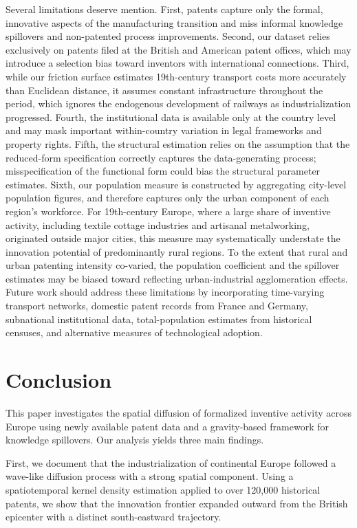 \documentclass[letterpaper,12pt,leqno]{article}
\begin{document}
Several limitations deserve mention. First, patents capture only the formal, innovative aspects of the manufacturing transition and miss informal knowledge spillovers and non-patented process improvements. Second, our dataset relies exclusively on patents filed at the British and American patent offices, which may introduce a selection bias toward inventors with international connections. Third, while our friction surface estimates 19th-century transport costs more accurately than Euclidean distance, it assumes constant infrastructure throughout the period, which ignores the endogenous development of railways as industrialization progressed. Fourth, the institutional data is available only at the country level and may mask important within-country variation in legal frameworks and property rights. Fifth, the structural estimation relies on the assumption that the reduced-form specification correctly captures the data-generating process; misspecification of the functional form could bias the structural parameter estimates. Sixth, our population measure is constructed by aggregating city-level population figures, and therefore captures only the urban component of each region's workforce. For 19th-century Europe, where a large share of inventive activity, including textile cottage industries and artisanal metalworking, originated outside major cities, this measure may systematically understate the innovation potential of predominantly rural regions. To the extent that rural and urban patenting intensity co-varied, the population coefficient and the spillover estimates may be biased toward reflecting urban-industrial agglomeration effects. Future work should address these limitations by incorporating time-varying transport networks, domestic patent records from France and Germany, subnational institutional data, total-population estimates from historical censuses, and alternative measures of technological adoption.

\section{Conclusion}

This paper investigates the spatial diffusion of formalized inventive activity across Europe using newly available patent data and a gravity-based framework for knowledge spillovers. Our analysis yields three main findings.

First, we document that the industrialization of continental Europe followed a wave-like diffusion process with a strong spatial component. Using a spatiotemporal kernel density estimation applied to over 120,000 historical patents, we show that the innovation frontier expanded outward from the British epicenter with a distinct south-eastward trajectory.
\end{document}
